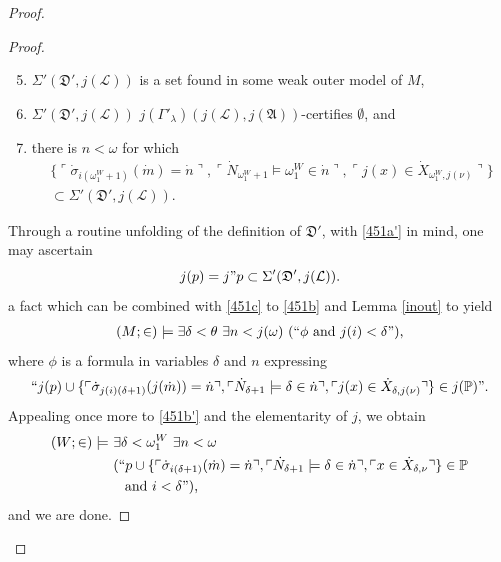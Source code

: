 \documentclass[12pt, twoside]{memoir}
\numberwithin{equation}{section}
\theoremstyle{definition}
\theoremstyle{remark}
\theoremstyle{definition}
\theoremstyle{definition}
\theoremstyle{definition}
\theoremstyle{remark}
\begin{document}
\begin{proof}
\begin{proof}
\begin{enumerate}[label=(\alph*)]
    \setcounter{enumi}{4}
    \item\label{451c} $\Sigma'(\mathfrak{D}', j(\mathcal{L}))$ is a set found in some weak outer model of $M$,
    \item\label{451a} $\Sigma'(\mathfrak{D}', j(\mathcal{L}))$ $j(\Gamma'_{\lambda}) (j(\mathcal{L}), j(\mathfrak{A}))$-certifies $\emptyset$, and
    \item\label{451b} there is $n < \omega$ for which 
    \begin{gather*}
        \{\ulcorner \dot{\sigma}_{i(\omega_1^W + 1)}(\dot{m}) = \dot{n} \urcorner, \ulcorner \dot{N}_{\omega_1^W + 1} \models \omega_1^W \in \dot{n} \urcorner, \ulcorner j(x) \in \dot{X}_{\omega_1^W, j(\nu)} \urcorner\} \\
        \subset \Sigma'(\mathfrak{D}', j(\mathcal{L})) \text{.}
    \end{gather*}
\end{enumerate}
Through a routine unfolding of the definition of $\mathfrak{D}'$, with \ref{451a'} in mind, one may ascertain 
\begin{equation*}
    j(p) = j" p \subset \Sigma'(\mathfrak{D}', j(\mathcal{L})) \text{.}
\end{equation*}
a fact which can be combined with \ref{451c} to \ref{451b} and Lemma \ref{inout} to yield
\begin{align*}
    (M; \in) \models \exists \delta < \theta \ \exists n < j(\omega) \ (``\phi \text{ and } j(i) < \delta") \text{,}
\end{align*}
where $\phi$ is a formula in variables $\delta$ and $n$ expressing
\begin{equation*}
    ``j(p) \cup \{\ulcorner \dot{\sigma}_{j(i)(\delta + 1)}(j(\dot{m})) = \dot{n} \urcorner, \ulcorner \dot{N}_{\delta + 1} \models \delta \in \dot{n} \urcorner, \ulcorner j(x) \in \dot{X}_{\delta, j(\nu)} \urcorner\} \in j(\mathbb{P})" \text{.}
\end{equation*}
Appealing once more to \ref{451b'} and the elementarity of $j$, we obtain
\begin{align*}
    (W; \in) \models \ & \exists \delta < \omega_1^W \ \exists n < \omega \\
    & (``p \cup \{\ulcorner \dot{\sigma}_{i(\delta + 1)}(\dot{m}) = \dot{n} \urcorner, \ulcorner \dot{N}_{\delta + 1} \models \delta \in \dot{n} \urcorner, \ulcorner x \in \dot{X}_{\delta, \nu} \urcorner\} \in \mathbb{P} \\
    & \mspace{15mu} \text{and } i < \delta") \text{,}
\end{align*}
and we are done.
\end{proof}


\end{proof}
\end{document}
